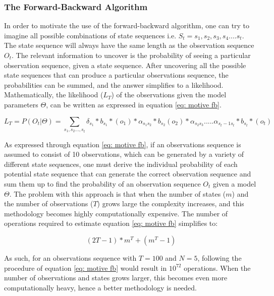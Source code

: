 \subsubsection{The Forward-Backward Algorithm}
\label{Section: Forward backward}
In order to motivate the use of the forward-backward algorithm, one can try to imagine all possible combinations of state sequences i.e. $S_t = s_1, s_2, s_3, s_4....s_t$. The state sequence will always have the same length as the observation sequence $O_t$. The relevant information to uncover is the probability of seeing a particular observation sequence, given a state sequence. After uncovering all the possible state sequences that can produce a particular observations sequence, the probabilities can be summed, and the answer simplifies to a likelihood. Mathematically, the likelihood ($L_T$) of the observations given the model parameters $\Theta$, can be written as expressed in equation \ref{eq: motive fb}.

\begin{equation}
    L_T = P(O_t|\Theta) = \sum_{s_1, s_2...,s_t} \delta_{s_1}*b_{s_1}*(o_1) * \alpha_{s_1s_2} * b_{s_2}(o_2)*\alpha_{s_2s_3} .....\alpha_{s_t-1 s_t}*b_{s_t}*(o_t)
    \label{eq: motive fb}
\end{equation}

As expressed through equation \ref{eq: motive fb}, if an observations sequence is assumed to consist of 10 observations, which can be generated by a variety of different state sequences, one must derive the individual probability of each potential state sequence that can generate the correct observation sequence and sum them up to find the probability of  an observation sequence $O_t$ given a model $\Theta$. The problem with this approach is that when the number of states ($m$) and the number of observations ($T$) grows large the complexity increases, and this methodology becomes highly computationally expensive. The number of operations required to estimate equation \ref{eq: motive fb} simplifies to:

\begin{equation}
    (2T-1)*m^T+(m^T-1)
\end{equation}

As such, for an observations sequence with $T = 100$ and $N = 5$, following the procedure of equation \ref{eq: motive fb} would result in $10^{72}$ operations. When the number of observations and states grows larger, this becomes even more computationally heavy, hence a better methodology is needed.  

